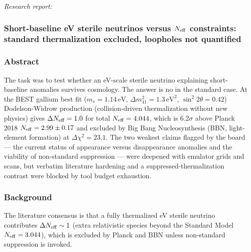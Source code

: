 \documentclass[11pt,a4paper]{article}
\begin{document}
\textit{Research report:}\par
\subsubsection*{Short-baseline eV sterile neutrinos versus $N_{\rm eff}$ constraints: standard thermalization excluded, loopholes not quantified}
\subsubsection*{Abstract}
The task was to test whether an eV-scale sterile neutrino explaining short-baseline anomalies survives cosmology. The answer is no in the standard case. At the BEST gallium best fit ($m_s = 1.14\,\mathrm{eV}$, $\Delta m^2_{41} = 1.3\,\mathrm{eV}^2$, $\sin^2 2\theta = 0.42$) Dodelson-Widrow production (collision-driven thermalization without new physics) gives $\Delta N_{\rm eff} = 1.0$ for total $N_{\rm eff} = 4.044$, which is $6.2\sigma$ above Planck 2018 $N_{\rm eff} = 2.99 \pm 0.17$ and excluded by Big Bang Nucleosynthesis (BBN, light-element formation) at $\Delta \chi^2 = 23.1$. The two weakest claims flagged by the board --- the current status of appearance versus disappearance anomalies and the viability of non-standard suppression --- were deepened with emulator grids and scans, but verbatim literature hardening and a suppressed-thermalization contrast were blocked by tool budget exhaustion.

\subsubsection*{Background}
The literature consensus is that a fully thermalized eV sterile neutrino contributes $\Delta N_{\rm eff} \sim 1$ (extra relativistic species beyond the Standard Model $N_{\rm eff} = 3.044$), which is excluded by Planck and BBN unless non-standard suppression is invoked.
\end{document}
